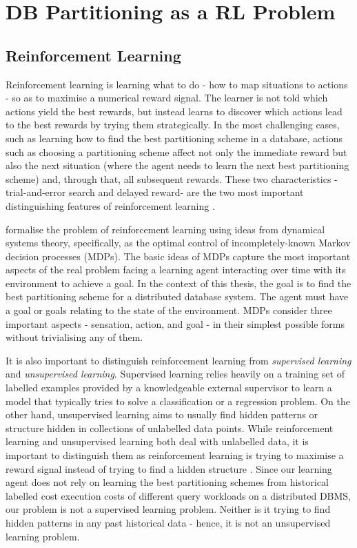 \chapter{DB Partitioning as a RL Problem}
\label{db_partitioning}
\section{Reinforcement Learning}
Reinforcement learning is learning what to do - how to map situations to actions - so as to maximise a numerical reward signal. The learner is not told which actions yield the best rewards, but instead learns to discover which actions lead to the best rewards by trying them strategically. In the most challenging cases, such as learning how to find the best partitioning scheme in a database, actions such as choosing a partitioning scheme affect not only the immediate reward but also the next situation (where the agent needs to learn the next best partitioning scheme) and, through that, all subsequent rewards. These two characteristics - trial-and-error search and delayed reward- are the two most important distinguishing features of reinforcement learning \cite{sutton2018reinforcement}.

\citeauthor{sutton2018reinforcement} formalise the problem of reinforcement learning using ideas from dynamical systems theory, specifically, as the optimal control of incompletely-known Markov decision processes (MDPs). The basic ideas of MDPs capture the most important aspects of the real problem facing a learning agent interacting over time with its environment to achieve a goal. In the context of this thesis, the goal is to find the best partitioning scheme for a distributed database system. The agent must have a goal or goals relating to the state of the environment. MDPs consider three important aspects - sensation, action, and goal - in their simplest possible forms without trivialising any of them. 

It is also important to distinguish reinforcement learning from \textit{supervised learning} and \textit{unsupervised learning}. Supervised learning relies heavily on a training set of labelled examples provided by a knowledgeable external supervisor to learn a model that typically tries to solve a classification or a regression problem. On the other hand, unsupervised learning aims to usually find hidden patterns or structure hidden in collections of unlabelled data points. While reinforcement learning and unsupervised learning both deal with unlabelled data, it is important to distinguish them as reinforcement learning is trying to maximise a reward signal instead of trying to find a hidden structure \cite{sutton2018reinforcement}. Since our learning agent does not rely on learning the best partitioning schemes from historical labelled cost execution costs of different query workloads on a distributed DBMS, our problem is not a supervised learning problem. Neither is it trying to find hidden patterns in any past historical data - hence, it is not an unsupervised learning problem.

